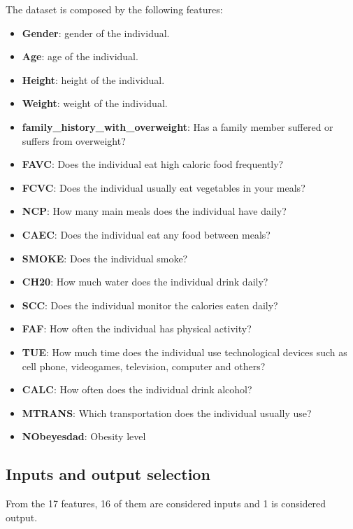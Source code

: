 \documentclass[11pt, a4paper]{article}
\begin{document}
\vspace{1em} The dataset is composed by the following features:

\begin{itemize}
    \item \textbf{Gender}: gender of the individual.
    \item \textbf{Age}: age of the individual.
    \item \textbf{Height}: height of the individual.
    \item \textbf{Weight}: weight of the individual.
    \item \textbf{family\_history\_with\_overweight}: Has a family member suffered or suffers from overweight?
    \item \textbf{FAVC}: Does the individual eat high caloric food frequently?
    \item \textbf{FCVC}: Does the individual usually eat vegetables in your meals?
    \item \textbf{NCP}: How many main meals does the individual have daily?
    \item \textbf{CAEC}: Does the individual eat any food between meals?
    \item \textbf{SMOKE}: Does the individual smoke?
    \item \textbf{CH20}: How much water does the individual drink daily?
    \item \textbf{SCC}: Does the individual monitor the calories eaten daily?
    \item \textbf{FAF}: How often the individual has physical activity?
    \item \textbf{TUE}: How much time does the individual use technological devices such as cell phone, videogames, television, computer and others?
    \item \textbf{CALC}: How often does the individual drink alcohol?
    \item \textbf{MTRANS}: Which transportation does the individual usually use?
    \item \textbf{NObeyesdad}: Obesity level
\end{itemize}

\subsection{Inputs and output selection}

From the 17 features, 16 of them are considered inputs and 1 is considered output.
\end{document}
